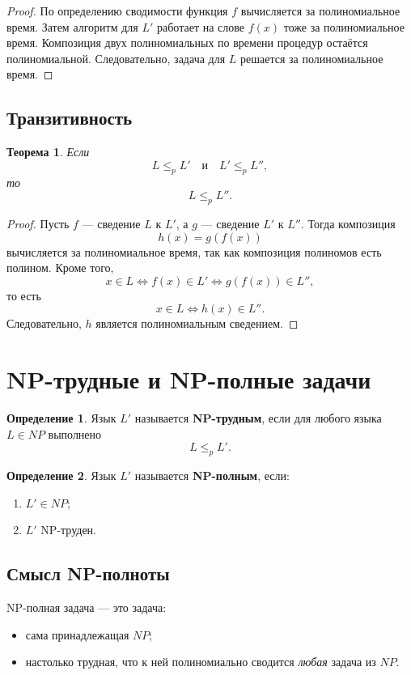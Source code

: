 \documentclass[12pt,a4paper]{article}
\theoremstyle{definition}
\newtheorem{definition}{Определение}[section]
\theoremstyle{plain}
\newtheorem{theorem}{Теорема}[section]
\begin{document}
\begin{proof}
По определению сводимости функция $f$ вычисляется за полиномиальное время. Затем алгоритм для $L'$ работает на слове $f(x)$ тоже за полиномиальное время. Композиция двух полиномиальных по времени процедур остаётся полиномиальной. Следовательно, задача для $L$ решается за полиномиальное время.
\end{proof}

\subsection{Транзитивность}
\begin{theorem}
Если
\[
L\le_p L' \quad \text{и}\quad L'\le_p L'',
\]
то
\[
L\le_p L''.
\]
\end{theorem}

\begin{proof}
Пусть $f$ --- сведение $L$ к $L'$, а $g$ --- сведение $L'$ к $L''$. Тогда композиция
\[
h(x)=g(f(x))
\]
вычисляется за полиномиальное время, так как композиция полиномов есть полином. Кроме того,
\[
x\in L \iff f(x)\in L' \iff g(f(x))\in L'',
\]
то есть
\[
x\in L \iff h(x)\in L''.
\]
Следовательно, $h$ является полиномиальным сведением.
\end{proof}

\section{NP-трудные и NP-полные задачи}

\begin{definition}
Язык $L'$ называется \textbf{NP-трудным}, если для любого языка $L\in NP$ выполнено
\[
L\le_p L'.
\]
\end{definition}

\begin{definition}
Язык $L'$ называется \textbf{NP-полным}, если:
\begin{enumerate}
\item $L'\in NP$;
\item $L'$ NP-труден.
\end{enumerate}
\end{definition}

\subsection{Смысл NP-полноты}
NP-полная задача --- это задача:
\begin{itemize}
\item сама принадлежащая $NP$;
\item настолько трудная, что к ней полиномиально сводится \emph{любая} задача из $NP$.
\end{itemize}
\end{document}
